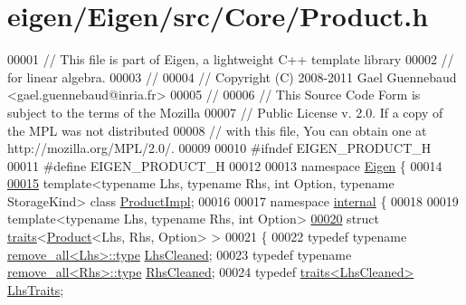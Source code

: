 \hypertarget{eigen_2_eigen_2src_2_core_2_product_8h_source}{}\section{eigen/\+Eigen/src/\+Core/\+Product.h}
\label{eigen_2_eigen_2src_2_core_2_product_8h_source}

\begin{DoxyCode}
00001 \textcolor{comment}{// This file is part of Eigen, a lightweight C++ template library}
00002 \textcolor{comment}{// for linear algebra.}
00003 \textcolor{comment}{//}
00004 \textcolor{comment}{// Copyright (C) 2008-2011 Gael Guennebaud <gael.guennebaud@inria.fr>}
00005 \textcolor{comment}{//}
00006 \textcolor{comment}{// This Source Code Form is subject to the terms of the Mozilla}
00007 \textcolor{comment}{// Public License v. 2.0. If a copy of the MPL was not distributed}
00008 \textcolor{comment}{// with this file, You can obtain one at http://mozilla.org/MPL/2.0/.}
00009 
00010 \textcolor{preprocessor}{#ifndef EIGEN\_PRODUCT\_H}
00011 \textcolor{preprocessor}{#define EIGEN\_PRODUCT\_H}
00012 
00013 \textcolor{keyword}{namespace }\hyperlink{namespace_eigen}{Eigen} \{
00014 
\hyperlink{class_eigen_1_1_product_impl}{00015} \textcolor{keyword}{template}<\textcolor{keyword}{typename} Lhs, \textcolor{keyword}{typename} Rhs, \textcolor{keywordtype}{int} Option, \textcolor{keyword}{typename} StorageKind> \textcolor{keyword}{class }
      \hyperlink{class_eigen_1_1_product_impl}{ProductImpl};
00016 
00017 \textcolor{keyword}{namespace }\hyperlink{namespaceinternal}{internal} \{
00018 
00019 \textcolor{keyword}{template}<\textcolor{keyword}{typename} Lhs, \textcolor{keyword}{typename} Rhs, \textcolor{keywordtype}{int} Option>
\hyperlink{struct_eigen_1_1internal_1_1traits_3_01_product_3_01_lhs_00_01_rhs_00_01_option_01_4_01_4}{00020} \textcolor{keyword}{struct }\hyperlink{struct_eigen_1_1internal_1_1traits}{traits}<\hyperlink{group___core___module_class_eigen_1_1_product}{Product}<Lhs, Rhs, Option> >
00021 \{
00022   \textcolor{keyword}{typedef} \textcolor{keyword}{typename} \hyperlink{group___sparse_core___module}{remove\_all<Lhs>::type} \hyperlink{group___sparse_core___module}{LhsCleaned};
00023   \textcolor{keyword}{typedef} \textcolor{keyword}{typename} \hyperlink{group___sparse_core___module}{remove\_all<Rhs>::type} \hyperlink{group___sparse_core___module}{RhsCleaned};
00024   \textcolor{keyword}{typedef} \hyperlink{struct_eigen_1_1internal_1_1traits}{traits<LhsCleaned>} \hyperlink{struct_eigen_1_1internal_1_1traits}{LhsTraits};

\end{DoxyCode}
